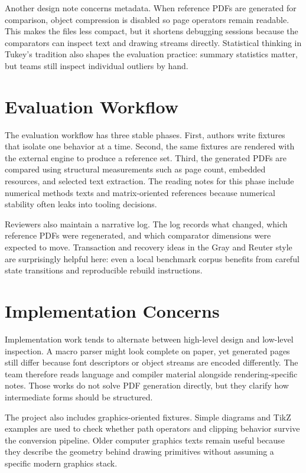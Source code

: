 \documentclass{article}
\begin{document}
Another design note concerns metadata. When reference PDFs are generated for
comparison, object compression is disabled so page operators remain readable.
This makes the files less compact, but it shortens debugging sessions because
the comparators can inspect text and drawing streams directly. Statistical
thinking in Tukey's tradition also shapes the evaluation practice: summary
statistics matter, but teams still inspect individual outliers by hand.

\section{Evaluation Workflow}
The evaluation workflow has three stable phases. First, authors write fixtures
that isolate one behavior at a time. Second, the same fixtures are rendered with
the external engine to produce a reference set. Third, the generated PDFs are
compared using structural measurements such as page count, embedded resources,
and selected text extraction. The reading notes for this phase include numerical
methods texts and matrix-oriented references because numerical stability often
leaks into tooling decisions.

Reviewers also maintain a narrative log. The log records what changed, which
reference PDFs were regenerated, and which comparator dimensions were expected
to move. Transaction and recovery ideas in the Gray and Reuter style are surprisingly
helpful here: even a local benchmark corpus benefits from careful state
transitions and reproducible rebuild instructions.

\clearpage
\section{Implementation Concerns}
Implementation work tends to alternate between high-level design and low-level
inspection. A macro parser might look complete on paper, yet generated pages
still differ because font descriptors or object streams are encoded differently.
The team therefore reads language and compiler material alongside
rendering-specific notes. Those works do not solve PDF generation directly, but
they clarify how intermediate forms should be structured.

The project also includes graphics-oriented fixtures. Simple diagrams and TikZ
examples are used to check whether path operators and clipping behavior survive
the conversion pipeline. Older computer graphics texts
remain useful because they describe the geometry behind drawing primitives
without assuming a specific modern graphics stack.
\end{document}
